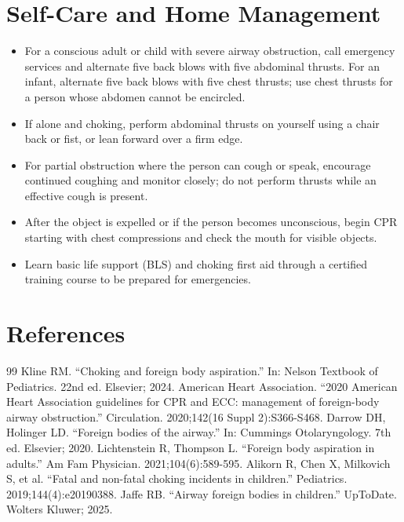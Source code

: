 \section*{Self-Care and Home Management}
\begin{itemize}
   \item For a conscious adult or child with severe airway obstruction, call emergency services and alternate five back blows with five abdominal thrusts. For an infant, alternate five back blows with five chest thrusts; use chest thrusts for a person whose abdomen cannot be encircled.
  \item If alone and choking, perform abdominal thrusts on yourself using a chair back or fist, or lean forward over a firm edge.
  \item For partial obstruction where the person can cough or speak, encourage continued coughing and monitor closely; do not perform thrusts while an effective cough is present.
  \item After the object is expelled or if the person becomes unconscious, begin CPR starting with chest compressions and check the mouth for visible objects.
  \item Learn basic life support (BLS) and choking first aid through a certified training course to be prepared for emergencies.
\end{itemize}

\section*{References}
\begin{thebibliography}{99}
 Kline RM. ``Choking and foreign body aspiration.'' In: Nelson Textbook of Pediatrics. 22nd ed. Elsevier; 2024.
 American Heart Association. ``2020 American Heart Association guidelines for CPR and ECC: management of foreign-body airway obstruction.'' Circulation. 2020;142(16 Suppl 2):S366-S468.
 Darrow DH, Holinger LD. ``Foreign bodies of the airway.'' In: Cummings Otolaryngology. 7th ed. Elsevier; 2020.
 Lichtenstein R, Thompson L. ``Foreign body aspiration in adults.'' Am Fam Physician. 2021;104(6):589-595.
 Alikorn R, Chen X, Milkovich S, et al. ``Fatal and non-fatal choking incidents in children.'' Pediatrics. 2019;144(4):e20190388.
 Jaffe RB. ``Airway foreign bodies in children.'' UpToDate. Wolters Kluwer; 2025.
\end{thebibliography}
